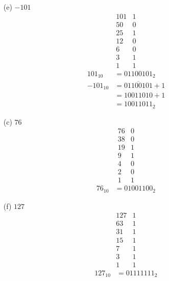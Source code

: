 \begin{changemargin}{-5mm}{-5mm}
\begin{multicols}{3}
\begin{enumerate}
  \item[\textsf{(e)}] \(-101\)
  \[
  \begin{array}{r|l}
    101 & 1\\
     50 & 0\\
     25 & 1\\
     12 & 0\\
      6 & 0\\
      3 & 1\\
      1 & 1
  \end{array}
  \]
  \begin{align*}
    101_{10} &= 01100101_2\\
   -101_{10} &= \overline{01100101} + 1\\
            &= 10011010 + 1\\
            &= 10011011_2
  \end{align*}
\end{enumerate}

\par\vfill\columnbreak

\begin{enumerate}

  \item[\textsf{(c)}] \(76\)
  \[
  \begin{array}{r|l}
    76 & 0\\
    38 & 0\\
    19 & 1\\
    9  & 1\\
    4  & 0\\
    2  & 0\\
    1  & 1
  \end{array}
  \]
  \begin{align*}76_{10}&=01001100_2\end{align*}

  \item[\textsf{(f)}] \(127\)
  \[
  \begin{array}{r|l}
    127 & 1\\
     63 & 1\\
     31 & 1\\
     15 & 1\\
      7 & 1\\
      3 & 1\\
      1 & 1     
  \end{array}
  \]
  \begin{align*}127_{10} &= 01111111_2\end{align*}
\end{enumerate}

\end{multicols}
\end{changemargin}
